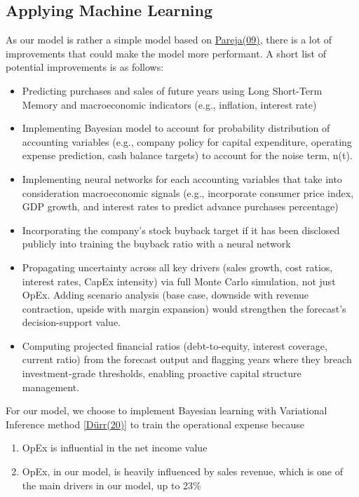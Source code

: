 \documentclass[12pt,a4paper]{article}
\begin{document}
\subsection{Applying Machine Learning}

As our model is rather a simple model based on \hyperlink{ref:pareja09}{Pareja(09)}, there is a lot
of improvements that could make the model more performant. A short list
of potential improvements is as follows:

\begin{itemize}
\item
  Predicting purchases and sales of future years using Long Short-Term
  Memory and macroeconomic indicators (e.g., inflation, interest rate)
\item
  Implementing Bayesian model to account for probability distribution of
  accounting variables (e.g., company policy for capital expenditure,
  operating expense prediction, cash balance targets) to account for the
  noise term, n(t).
\item
  Implementing neural networks for each accounting variables that take
  into consideration macroeconomic signals (e.g., incorporate consumer
  price index, GDP growth, and interest rates to predict advance
  purchases percentage)
\item
  Incorporating the company's stock buyback target if it has been
  disclosed publicly into training the buyback ratio with a neural
  network
\item
  Propagating uncertainty across all key drivers (sales growth, cost ratios, interest rates, CapEx intensity) via full Monte Carlo simulation, not just OpEx. Adding scenario analysis (base case, downside with revenue contraction, upside with margin expansion) would strengthen the forecast's decision-support value.
\item
  Computing projected financial ratios (debt-to-equity, interest coverage, current ratio) from the forecast output and flagging years where they breach investment-grade thresholds, enabling proactive capital structure management.
\end{itemize}

For our model, we choose to implement Bayesian learning with Variational
Inference method \hyperlink{ref:durr20}{[Dürr(20)]} to train the operational expense because

\begin{enumerate}
\def\labelenumi{\alph{enumi}.}
\item
  OpEx is influential in the net income value
\item
  OpEx, in our model, is heavily influenced by sales revenue, which is
  one of the main drivers in our model, up to 23\%
\end{enumerate}
\end{document}
